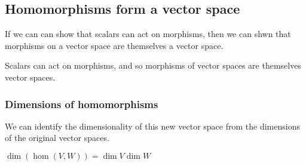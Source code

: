 
\subsection{Homomorphisms form a vector space}

If we can can show that scalars can act on morphisms, then we can shwn that morphisms on a vector space are themselves a vector space.

Scalars can act on morphisms, and so morphisms of vector spaces are themselves vector spaces.

\subsubsection{Dimensions of homomorphisms}

We can identify the dimensionality of this new vector space from the dimensions of the original vector spaces.

\(\dim (\hom(V, W))=\dim V \dim W\)

